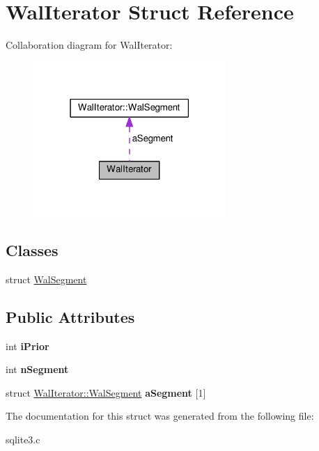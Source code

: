 \hypertarget{structWalIterator}{}\section{Wal\+Iterator Struct Reference}
\label{structWalIterator}


Collaboration diagram for Wal\+Iterator\+:\nopagebreak
\begin{figure}[H]
\begin{center}
\leavevmode
\includegraphics[width=207pt]{structWalIterator__coll__graph}
\end{center}
\end{figure}
\subsection*{Classes}
\begin{DoxyCompactItemize}
\item 
struct \hyperlink{structWalIterator_1_1WalSegment}{Wal\+Segment}
\end{DoxyCompactItemize}
\subsection*{Public Attributes}
\begin{DoxyCompactItemize}
\item 
int {\bfseries i\+Prior}\hypertarget{structWalIterator_a2f906125490dd3e967fc53768b03abbb}{}\label{structWalIterator_a2f906125490dd3e967fc53768b03abbb}

\item 
int {\bfseries n\+Segment}\hypertarget{structWalIterator_ad81bc9447d6043212289d127dc9fdafa}{}\label{structWalIterator_ad81bc9447d6043212289d127dc9fdafa}

\item 
struct \hyperlink{structWalIterator_1_1WalSegment}{Wal\+Iterator\+::\+Wal\+Segment} {\bfseries a\+Segment} \mbox{[}1\mbox{]}\hypertarget{structWalIterator_a6d3fcaaeeca5a0eee46f9fa7c3cb669b}{}\label{structWalIterator_a6d3fcaaeeca5a0eee46f9fa7c3cb669b}

\end{DoxyCompactItemize}


The documentation for this struct was generated from the following file\+:\begin{DoxyCompactItemize}
\item 
sqlite3.\+c\end{DoxyCompactItemize}
